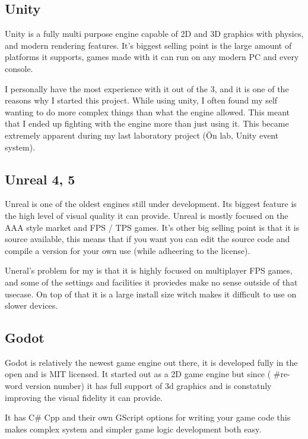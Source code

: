 \subsection{Unity}

Unity is a fully multi purpose engine capable of 2D and 3D graphics with physics, and modern rendering features. It's biggest selling point is the large amount of platforms it supports, games made with it can run on any modern PC and every console.

I personally have the most experience with it out of the 3, and it is one of the reasons why I started this project. While using unity, I often found my self wanting to do more complex things than what the engine allowed. This meant that I ended up fighting with the engine more than just using it. This became extremely apparent during my last laboratory project (Ön lab, Unity event system).

\subsection{Unreal 4, 5}

Unreal is one of the oldest engines still under development. Its biggest feature is the high level of visual quality it can provide. Unreal is mostly focused on the AAA style market and FPS / TPS games. It's other big selling point is that it is source available, this means that if you want you can edit the source code and compile a version for your own use (while adheering to the license).

Uneral's problem for my is that it is highly focused on multiplayer FPS games, and some of the settings and facilities it proviedes make no sense outside of that usecase. On top of that it is a large install size witch makes it difficult to use on slower devices.

\subsection{Godot}

Godot is relatively the newest game engine out there, it is developed fully in the open and is MIT licensed. It started out as a 2D game engine but since ( \#re-word version number) it has full support of 3d graphics and is constatnly improving the visual fidelity it can provide.

It has C\# Cpp and their own GScript options for writing your game code this makes complex system and simpler game logic development both easy.

